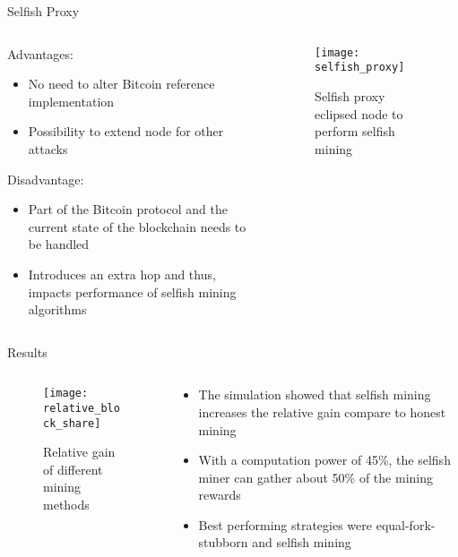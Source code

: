 \documentclass[final,hyperref={pdfpagelabels=true}]{beamer}
\begin{document}
\begin{frame}
\begin{block}{Selfish Proxy}
\begin{columns}[t]
\begin{column}{.45\textwidth}
     		\bigskip
     		Advantages:
     		\begin{itemize}
     			\item No need to alter Bitcoin reference implementation
     			\item Possibility to extend node for other attacks
			\end{itemize}
     		Disadvantage:
     		\begin{itemize}
     			\item Part of the Bitcoin protocol and the current state of the blockchain needs to be handled
     			\item Introduces an extra hop and thus, impacts performance of selfish mining algorithms
			\end{itemize}   			
    	\end{column}
 	
        \begin{column}{.45\textwidth}
        	\begin{figure}[t]
        	    \vspace*{-1cm}
            	\texttt{[image: selfish\_proxy]}
            	\centering
            	\caption{Selfish proxy eclipsed node to perform selfish mining}
        	\end{figure} 
    	\end{column}
    	
  	\end{columns}
  \end{block}

  \begin{columns}[t]

    \begin{column}{.55\textwidth}
      \begin{block}{Results}
		
		\begin{columns}[t]

    		\begin{column}{.45\textwidth}
        		\begin{figure}[t]
        			\vspace*{-1cm}
            		\texttt{[image: relative\_block\_share]}
            		\centering
            		\caption{Relative gain of different mining methods}
        		\end{figure}
    		\end{column}
    		\begin{column}{.45\textwidth}
				\begin{itemize}
					\item The simulation showed that selfish mining increases the relative gain compare to honest mining
					\item With a computation power of 45\%, the selfish miner can gather about 50\% of the mining rewards
					\item Best performing strategies were equal-fork-stubborn and selfish mining
				\end{itemize}
    		\end{column}
  		\end{columns}
  		

\end{block}
\end{column}
\end{columns}
\end{frame}
\end{document}
